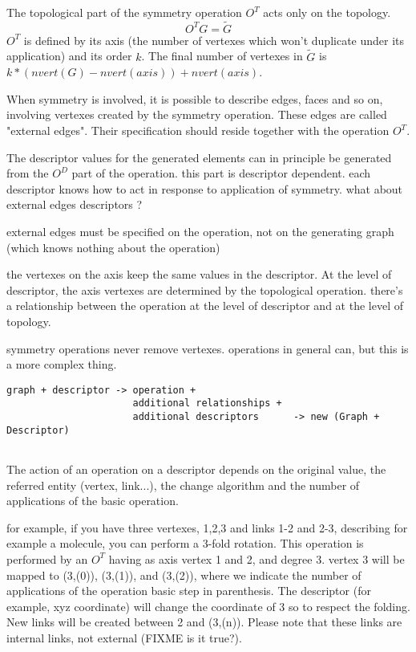 The topological part of the symmetry operation $O^{T}$ acts only on the topology.
\begin{equation}
O^{T} G = \tilde{G}
\end{equation}
$O^{T}$ is defined by its axis (the number of vertexes which won't duplicate
under its application) and its order $k$. The final number of vertexes in
$\tilde{G}$ is $ k*(nvert(G) - nvert(axis)) + nvert(axis)$.

When symmetry is involved, it is possible to describe edges, faces and so
on, involving vertexes created by the symmetry operation. These edges are
called "external edges". Their specification should reside together with the
operation $O^{T}$.

The descriptor values for the generated elements can in principle be
generated from the $O^{D}$ part of the operation. this part is descriptor
dependent. each descriptor knows how to act in response to application of
symmetry. what about external edges descriptors ?


external edges must be specified on the operation, not on the generating
graph (which knows nothing about the operation)

the vertexes on the axis keep the same values in the descriptor.
At the level of descriptor, the axis vertexes are determined by the
topological operation. there's a relationship between the operation at the
level of descriptor and at the level of topology.

symmetry operations never remove vertexes. operations in general can, but
this is a more complex thing.



\begin{verbatim}
graph + descriptor -> operation + 
                      additional relationships + 
                      additional descriptors      -> new (Graph + Descriptor)
                                                  
\end{verbatim}

The action of an operation on a descriptor depends on the original value,
the referred entity (vertex, link...), the change algorithm and the number
of applications of the basic operation.

for example, if you have three vertexes, 1,2,3 and links 1-2 and 2-3,
describing for example a molecule, you can perform a 3-fold rotation. This
operation is performed by an $O^{T}$ having as axis vertex 1 and 2, and
degree 3. vertex 3 will be mapped to (3,(0)), (3,(1)), and (3,(2)), where we
indicate the number of applications of the operation basic step in
parenthesis. The descriptor (for example, xyz coordinate) will change the
coordinate of 3 so to respect the folding. New links will be created between
2 and (3,(n)). Please note that these links are internal links, not
external (FIXME is it true?).

